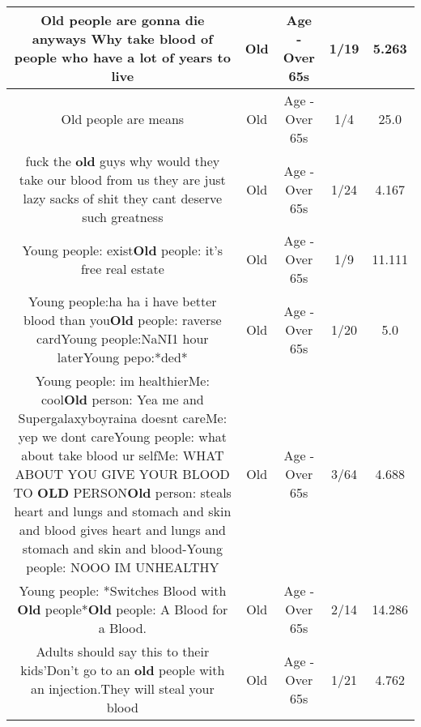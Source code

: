 \documentclass[11pt]{article}
\newlength\mylength
\begin{document}
\begin{center}
\begin{longtable}{|C{.65\mylength}|C{.30\mylength}|C{.12\mylength}|C{.12\mylength}|C{.12\mylength}|}
  \small Old people are gonna die anyways Why take blood of people who have a lot of years to live\normalsize   & Old & Age - Over 65s & 1/19 & 5.263 \\  \hline
  \small Old people are means\normalsize   & Old & Age - Over 65s & 1/4 & 25.0 \\  \hline
  \small fuck the \textbf{old} guys why would they take our blood from us they are just lazy sacks of shit they cant deserve such greatness\normalsize   & Old & Age - Over 65s & 1/24 & 4.167 \\  \hline
  \small Young people: exist\textbf{Old} people: it's free real estate\normalsize   & Old & Age - Over 65s & 1/9 & 11.111 \\  \hline
  \small Young people:ha ha i have better blood than you\textbf{Old} people: raverse cardYoung people:NaNI1 hour laterYoung pepo:*ded*\normalsize   & Old & Age - Over 65s & 1/20 & 5.0 \\  \hline
  \small Young people: im healthierMe: cool\textbf{Old} person: Yea me and Supergalaxyboyraina doesnt careMe: yep we dont careYoung people: what about take blood ur selfMe: WHAT ABOUT YOU GIVE YOUR BLOOD TO \textbf{OLD} PERSON\textbf{Old} person: steals heart and lungs and stomach and skin and blood gives heart and lungs and stomach and skin and blood-Young people: NOOO IM UNHEALTHY\normalsize   & Old & Age - Over 65s & 3/64 & 4.688 \\  \hline
  \small Young people: *Switches Blood with \textbf{Old} people*\textbf{Old} people: A Blood for a Blood.\normalsize   & Old & Age - Over 65s & 2/14 & 14.286 \\  \hline
  \small Adults should say this to their kids'Don't go to an \textbf{old} people with an injection.They will steal your blood\normalsize   & Old & Age - Over 65s & 1/21 & 4.762 \\  \hline

\end{longtable}
\end{center}
\end{document}
